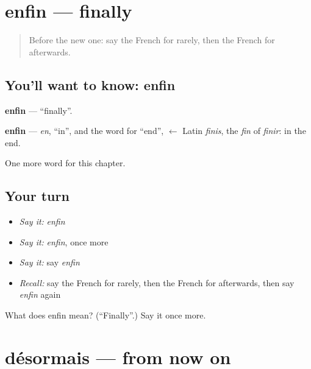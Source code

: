 \section[enfin]{enfin — finally}

\label{lesson:FR-C156-enfin}



\begin{quote}
Before the new one: say the French for rarely, then the French for afterwards.
\end{quote}

\subsection*{You'll want to know: enfin}
\textbf{enfin} — \textquotedblleft{}finally\textquotedblright{}.

\begin{cousinweb}
\textbf{enfin} — \emph{en}, \textquotedblleft{}in\textquotedblright{}, and the word for \textquotedblleft{}end\textquotedblright{}, $\leftarrow$ Latin \emph{finis}, the \emph{fin} of \emph{finir}: in the end.
\end{cousinweb}

\begin{grammarlens}[title={What you've built}]
One more word for this chapter.
\end{grammarlens}

\subsection*{Your turn}
\begin{itemize}
\raggedright
  \item \emph{Say it:} \emph{enfin}
  \item \emph{Say it:} \emph{enfin}, once more
  \item \emph{Say it:} say \emph{enfin}
  \item \emph{Recall:} say the French for rarely, then the French for afterwards, then say \emph{enfin} again
\end{itemize}

\begin{tcolorbox}[breakable,colback=teal!4,colframe=teal!35!black,title={Before you move on}]
What does enfin mean? (\textquotedblleft{}Finally\textquotedblright{}.) Say it once more.
\end{tcolorbox}
\section[désormais]{désormais — from now on}

